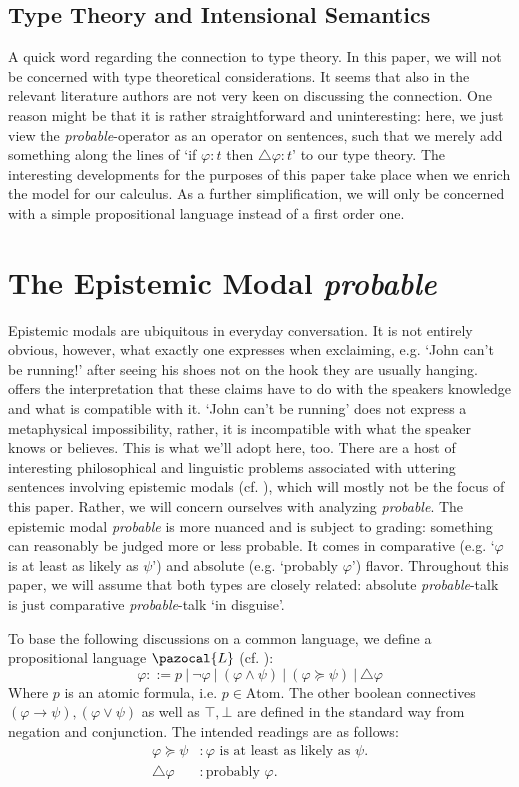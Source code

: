 \documentclass{article}
\theoremstyle{definition}
\renewcommand{\L}{\pazocal{L}}
\begin{document}
\subsection{Type Theory and Intensional Semantics}
A quick word regarding the connection to type theory. In this paper, we will not be concerned with type theoretical considerations. It seems that also in the relevant literature authors are not very keen on discussing the connection. One reason might be that it is rather straightforward and uninteresting: here, we just view the \emph{probable}-operator as an operator on sentences, such that we merely add something along the lines of `if $\varphi:t$ then $\triangle \varphi:t$' to our type theory. The interesting developments for the purposes of this paper take place when we enrich the model for our calculus. As a further simplification, we will only be concerned with a simple propositional language instead of a first order one.

\section{The Epistemic Modal \emph{probable}}
Epistemic modals are ubiquitous in everyday conversation.
It is not entirely obvious, however, what exactly one expresses when exclaiming, e.g. `John can't be running!' after seeing his shoes not on the hook they are usually hanging.
\textcite{macfarlane11_are_asses_sensit} offers the interpretation that these claims have to do with the speakers knowledge and what is compatible with it.
`John can't be running' does not express a metaphysical impossibility, rather, it is incompatible with what the speaker knows or believes.
This is what we'll adopt here, too.
There are a host of interesting philosophical and linguistic problems associated with uttering sentences involving epistemic modals (cf. \cite{yalcin07_epist_modal}), which will mostly not be the focus of this paper.
Rather, we will concern ourselves with analyzing \emph{probable}.
The epistemic modal \emph{probable} is more nuanced and is subject to grading:
something can reasonably be judged more or less probable. It comes in comparative (e.g. `$\varphi$ is at least as likely as $\psi$') and absolute (e.g. `probably $\varphi$') flavor.
Throughout this paper, we will assume that both types are closely related: absolute \emph{probable}-talk is just comparative \emph{probable}-talk `in disguise'.


To base the following discussions on a common language, we define a propositional language $\L$ (cf. \cite{harrison-trainor17_prefer}):
\[
\varphi ::= p ~|~ \neg \varphi ~|~ (\varphi \land \psi) ~|~  (\varphi \succeq \psi) ~|~ \triangle\varphi 
\]
Where $p$ is an atomic formula, i.e. $p \in \text{Atom}$. The other boolean connectives $(\varphi \rightarrow \psi), (\varphi \vee
\psi)$ as well as $\top, \bot$ are defined in the standard way from negation and conjunction.
The intended readings are as follows:
\begin{align*}
  \varphi \succeq \psi &: \varphi \text{ is at least as likely as } \psi. \\
  \triangle \varphi &:\text{probably } \varphi. \\ 
\end{align*}
\end{document}
